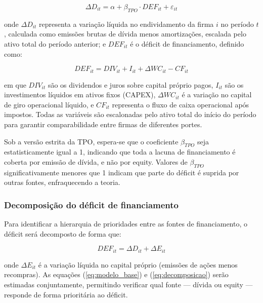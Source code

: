 \documentclass[a4paper,12pt]{article}
\begin{document}
\begin{equation}
    \Delta D_{it} = \alpha + \beta_{TPO} \cdot DEF_{it} + \varepsilon_{it}
    \label{eq:modelo_base}
\end{equation}
 
\noindent onde $\Delta D_{it}$ representa a variação líquida no endividamento da firma $i$ no período $t$, calculada como emissões brutas de dívida menos amortizações, escalada pelo ativo total do período anterior; e $DEF_{it}$ é o déficit de financiamento, definido como:
 
\begin{equation}
    DEF_{it} = DIV_{it} + I_{it} + \Delta WC_{it} - CF_{it}
    \label{eq:deficit}
\end{equation}
 
\noindent em que $DIV_{it}$ são os dividendos e juros sobre capital próprio pagos, $I_{it}$ são os investimentos líquidos em ativos fixos (CAPEX), $\Delta WC_{it}$ é a variação no capital de giro operacional líquido, e $CF_{it}$ representa o fluxo de caixa operacional após impostos. Todas as variáveis são escalonadas pelo ativo total do início do período para garantir comparabilidade entre firmas de diferentes portes.
 
Sob a versão estrita da TPO, espera-se que o coeficiente $\beta_{TPO}$ seja estatisticamente igual a 1, indicando que toda a lacuna de financiamento é coberta por emissão de dívida, e não por equity. Valores de $\beta_{TPO}$ significativamente menores que 1 indicam que parte do déficit é suprida por outras fontes, enfraquecendo a teoria.
 
\subsubsection{Decomposição do déficit de financiamento}
 
Para identificar a hierarquia de prioridades entre as fontes de financiamento, o déficit será decomposto de forma que:
 
\begin{equation}
    DEF_{it} = \Delta D_{it} + \Delta E_{it}
    \label{eq:decomposicao}
\end{equation}
 
\noindent onde $\Delta E_{it}$ é a variação líquida no capital próprio (emissões de ações menos recompras). As equações (\ref{eq:modelo_base}) e (\ref{eq:decomposicao}) serão estimadas conjuntamente, permitindo verificar qual fonte — dívida ou equity — responde de forma prioritária ao déficit.
 
\end{document}
